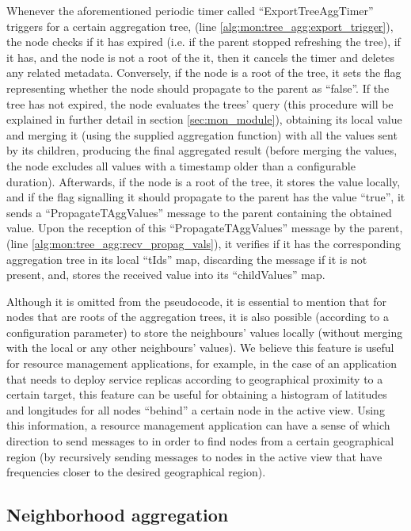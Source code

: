 Whenever the aforementioned periodic timer called ``ExportTreeAggTimer'' triggers for a certain aggregation tree, (line \ref{alg:mon:tree_agg:export_trigger}), the node checks if it has expired (i.e. if the parent stopped refreshing the tree), if it has, and the node is not a root of the it, then it cancels the timer and deletes any related metadata. Conversely, if the node is a root of the tree, it sets the flag representing whether the node should propagate to the parent as ``false''. If the tree has not expired, the node evaluates the trees' query (this procedure will be explained in further detail in section \ref{sec:mon_module}), obtaining its local value and merging it (using the supplied aggregation function) with all the values sent by its children, producing the final aggregated result (before merging the values, the node excludes all values with a timestamp older than a configurable duration).  Afterwards, if the node is a root of the tree, it stores the value locally, and if the flag signalling it should propagate to the parent has the value ``true'', it sends a ``PropagateTAggValues'' message to the parent containing the obtained value. Upon the reception of this ``PropagateTAggValues'' message by the parent, (line \ref{alg:mon:tree_agg:recv_propag_vals}), it verifies if it has the corresponding aggregation tree in its local ``tIds'' map, discarding the message if it is not present, and, stores the received value into its ``childValues'' map.

Although it is omitted from the pseudocode, it is essential to mention that for nodes that are roots of the aggregation trees, it is also possible (according to a configuration parameter) to store the neighbours' values locally (without merging with the local or any other neighbours' values). We believe this feature is useful for resource management applications, for example, in the case of an application that needs to deploy service replicas according to geographical proximity to a certain target, this feature can be useful for obtaining a histogram of latitudes and longitudes for all nodes ``behind'' a certain node in the active view. Using this information, a resource management application can have a sense of which direction to send messages to in order to find nodes from a certain geographical region (by recursively sending messages to nodes in the active view that have frequencies closer to the desired geographical region). 

\subsection{Neighborhood aggregation} \label{sec:mon_protocol:neigh_agg}

